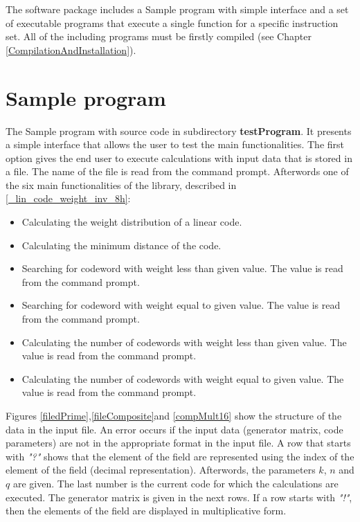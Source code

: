 	The software package includes a Sample program with simple interface and a set of executable programs that execute a single function for a specific instruction set. All of the including programs must be firstly compiled (see Chapter \ref{CompilationAndInstallation}).
	
	
	\section{Sample program}
	The Sample program with source code in subdirectory \textbf{testProgram}. It presents a simple interface that allows the user to test the main functionalities. The first option gives the end user to execute calculations with input data that is stored in a file. The name of the file is read from the command prompt. Afterwords one of the six main functionalities of the library, described in \ref{_lin_code_weight_inv_8h}:\\
	\begin{itemize}
		\item Calculating the weight distribution of a linear code.%
		\item Calculating the minimum distance of the code.
		\item Searching for codeword with weight less than given value. The value is read from the command prompt. 
		\item Searching for codeword with weight equal to given value. The value is read from the command prompt.
		\item Calculating the number of codewords with weight less than given value. The value is read from the command prompt.
		\item Calculating the number of codewords with weight equal to given value. The value is read from the command prompt.
	\end{itemize}
	Figures \ref{filedPrime},\ref{fileComposite}and \ref{compMult16} show the structure of the data in the input file. An error occurs if the input data (generator matrix, code parameters) are not in the appropriate format in the input file. A row that starts with \emph{"?"} shows that the element of the field are represented using the index of the element of the field (decimal representation). Afterwords, the parameters $k$, $n$ and $q$ are given. The last number is the current code for which the calculations are executed. The generator matrix is given in the next rows. If a row starts with \emph{"!"}, then the elements of the field are displayed in multiplicative form. 
